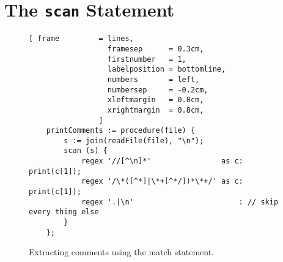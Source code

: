 \section{The \texttt{scan} Statement}
\begin{figure}[!ht]
\centering
\begin{Verbatim}[ frame         = lines, 
                  framesep      = 0.3cm, 
                  firstnumber   = 1,
                  labelposition = bottomline,
                  numbers       = left,
                  numbersep     = -0.2cm,
                  xleftmargin   = 0.8cm,
                  xrightmargin  = 0.8cm,
                ]
    printComments := procedure(file) {
        s := join(readFile(file), "\n");
        scan (s) {
            regex '//[^\n]*'                as c: print(c[1]);
            regex '/\*([^*]|\*+[^*/])*\*+/' as c: print(c[1]);
            regex '.|\n'                        : // skip every thing else
        }
    };
\end{Verbatim}
\vspace*{-0.3cm}
\caption{Extracting comments using the match statement.}
\label{fig:find-comments-scan.stlx}
\end{figure}

